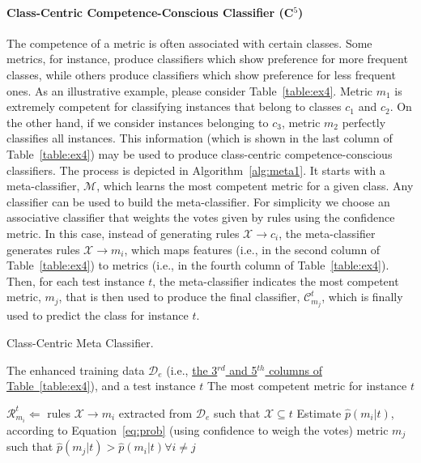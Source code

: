 \paragraph*{Class-Centric Competence-Conscious Classifier (C$^5$)} The competence of a metric is often associated with certain classes. Some metrics, for instance, produce classifiers which show preference for more frequent classes, while others produce classifiers which show preference for less frequent ones.
As an illustrative example, please consider Table~\ref{table:ex4}.
Metric $m_1$ is extremely competent for classifying instances that belong to classes $c_1$ and $c_2$. On the other hand, if we consider instances belonging to $c_3$, metric $m_2$ perfectly classifies all instances. This information (which is shown in the last column of Table~\ref{table:ex4}) may be used to produce class-centric competence-conscious classifiers. The process is depicted in Algorithm~\ref{alg:meta1}. It starts with a meta-classifier, $\mathcal{M}$, which learns the most competent metric for a given class. Any classifier can be used to build the meta-classifier. For simplicity we choose an associative classifier that weights the votes given by rules using the confidence metric. In this case, instead of generating rules $\mathcal{X}\xrightarrow{}c_i$, the meta-classifier generates rules $\mathcal{X}\xrightarrow{}m_i$, which maps features (i.e., in the second column of Table~\ref{table:ex4}) to metrics (i.e., in the fourth column of Table~\ref{table:ex4}). Then, for each test instance $t$, the meta-classifier indicates the most competent metric, $m_j$, that is then used to produce the final classifier, $\mathcal{C}^t_{m_j}$, which is finally used to predict the class for instance $t$.

\begin{algorithm} [htp]
\caption{Class-Centric Meta Classifier.}
\begin{algorithmic}[1]
\REQUIRE The enhanced training data $\mathcal{D}_e$ (i.e., \underline{the 3$^{rd}$ and 5$^{th}$ columns of Table~\ref{table:ex4}}), and a test instance $t$
\ENSURE The most competent metric for instance $t$

\medskip

\STATE $\mathcal{R}^{t}_{m_i}\Leftarrow$ rules $\mathcal{X}\xrightarrow{}m_i$ extracted from $\mathcal{D}_e$ such that $\mathcal{X}\subseteq t$
\STATE Estimate $\hat{p}(m_i|t)$, according to Equation~\ref{eq:prob} (using confidence to weigh the votes)
\ENDFOR
{} metric $m_j$ such that $\hat{p}(m_j|t)>\hat{p}(m_i|t)\forall i\ne j$

\end{algorithmic}
\label{alg:meta1}
\end{algorithm}

